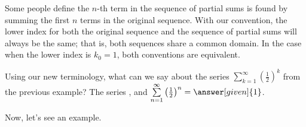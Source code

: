 \documentclass{ximera}
\begin{document}
\begin{remark}
Some people define the $n$-th term in the sequence of partial sums is found by summing the first $n$ terms in the original sequence.  With our convention, the lower index for both the original sequence and the sequence of partial sums will always be the same; that is, both sequences share a common domain.  In the case when the lower index is $k_0=1$, both conventions are equivalent.
\end{remark}









\begin{question}
  Using our new terminology, what can we say about the series $\sum\limits_{k=1}^\infty \left(\frac{1}{2}\right)^k$ from the previous example?  The series     , and
      $\sum\limits_{n=1}^\infty \left(\frac{1}{2}\right)^n = \answer[given]{1}$.
  \end{question}








Now, let's see an example.
\end{document}
